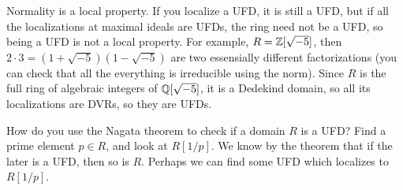  \setcounter{lecture}{38}

 Normality is a local property. If you localize a UFD, it is still a UFD, but if all the
 localizations at maximal ideals are UFDs, the ring need not be a UFD, so being a UFD is
 not a local property. For example, $R=\mathbb{Z}[\sqrt{-5}]$, then $2\cdot
 3=(1+\sqrt{-5})(1-\sqrt{-5})$ are two essensially different factorizations (you can
 check that all the everything is irreducible using the norm). Since $R$ is the full ring
 of algebraic integers of $\mathbb{Q}[\sqrt{-5}]$, it is a Dedekind domain, so all its
 localizations are DVRs, so they are UFDs.

 How do you use the Nagata theorem to check if a domain $R$ is a UFD? Find a prime
 element $p\in R$, and look at $R[1/p]$. We know by the theorem that if the later is a
 UFD, then so is $R$. Perhaps we can find some UFD which localizes to $R[1/p]$.

